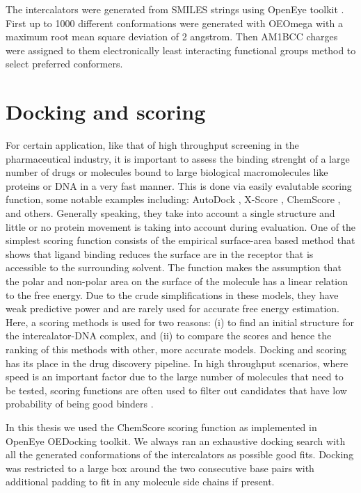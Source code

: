 The intercalators were generated from SMILES strings using OpenEye toolkit \cite{hawkins2010conformer}. First up to 1000 different conformations were generated with OEOmega with a maximum root mean square deviation of 2 angstrom. Then AM1BCC charges were assigned to them electronically least interacting functional groups method to select preferred conformers.

\section{Docking and scoring}

For certain application, like that of high throughput screening in the pharmaceutical industry, it is important to assess the binding strenght of a large number of drugs or molecules bound to large biological macromolecules like proteins or DNA in a very fast manner. This is done via easily evalutable scoring function, some notable examples including: AutoDock \cite{trott2010autodock}, X-Score \cite{wang2002further}, ChemScore \cite{eldridge1997empirical}, and others. Generally speaking, they take into account a single structure and little or no protein movement is taking into account during evaluation. One of the simplest scoring function  consists of the empirical surface-area based method that shows that ligand binding reduces the surface are in the receptor that is accessible to the surrounding solvent. The function makes the assumption that the polar and non-polar area on the surface of the molecule has a linear relation to the free energy. Due to the crude simplifications in these models, they have weak predictive power and are rarely used for accurate free energy estimation. Here, a scoring methods is used for two reasons: (i) to find an initial structure for the intercalator-DNA complex, and (ii) to compare the scores and hence the ranking of this methods with other, more accurate models. Docking and scoring has its place in the drug discovery pipeline. In high throughput scenarios, where speed is an important factor due to the large number of molecules that need to be tested, scoring functions are often used to filter out candidates that have low probability of being good binders \cite{mobley2009binding}.

In this thesis we used the ChemScore scoring function as implemented in OpenEye OEDocking toolkit. We always ran an exhaustive docking search with all the generated conformations of the intercalators as possible good fits. Docking was restricted to a large box around the two consecutive base pairs with additional padding to fit in any molecule side chains if present. 






